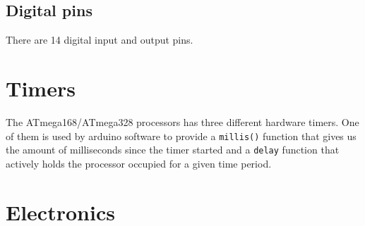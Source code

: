 \documentclass[a4paper,oneside, draft]{memoir}
\begin{document}
\subsection{Digital pins}
There are 14 digital input and output pins.


\section{Timers}
The ATmega168/ATmega328 processors has three different hardware
timers. One of them is used by arduino software to provide a
\texttt{millis()} function that gives us the amount of milliseconds
since the timer started and a \texttt{delay} function that actively
holds the processor occupied for a given time period.


\section{Electronics}
\end{document}
